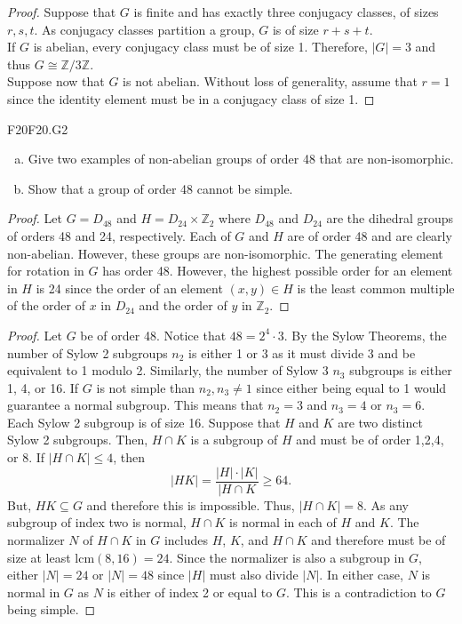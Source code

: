 \documentclass{article}
\newcommand{\Z}{\mathbb{Z}}
\newcommand{\sq}{\subseteq}
\newcommand{\lcm}{\textrm{lcm}}
\theoremstyle{definition}
\begin{document}
	\begin{proof}
	Suppose that $G$ is finite and has exactly three conjugacy classes, of sizes $r, s, t$. As conjugacy classes partition a group, $G$ is of size $r + s + t$.\\
	
	If $G$ is abelian, every conjugacy class must be of size 1. Therefore, $|G| = 3$ and thus $G \cong \Z/3\Z$.\\
	
	Suppose now that $G$ is not abelian. Without loss of generality, assume that $r = 1$ since the identity element must be in a conjugacy class of size 1. 
	\end{proof}
	
	
	\begin{prob}{F20}{F20.G2}
	\begin{enumerate}[(a)]
	\item Give two examples of non-abelian groups of order 48 that are non-isomorphic.
	\item Show that a group of order 48 cannot be simple.
	\end{enumerate}
	\end{prob}
	
	\begin{proof}
	Let $G = D_{48}$ and $H = D_{24} \times \Z_2$ where $D_{48}$ and $D_{24}$ are the dihedral groups of orders 48 and 24, respectively. Each of $G$ and $H$ are of order 48 and are clearly non-abelian. However, these groups are non-isomorphic. The generating element for rotation in $G$ has order 48. However, the highest possible order for an element in $H$ is 24 since the order of an element $(x,y) \in H$ is the least common multiple of the order of $x$ in $D_{24}$ and the order of $y$ in $\Z_2$.
	\end{proof}
	
	\begin{proof}
	Let $G$ be of order 48. Notice that $48 = 2^4 \cdot 3$. By the Sylow Theorems, the number of Sylow 2 subgroups $n_2$ is either 1 or 3 as it must divide 3 and be equivalent to 1 modulo 2. Similarly, the number of Sylow 3 $n_3$ subgroups is either 1, 4, or 16. If $G$ is not simple than $n_2, n_3 \neq 1$ since either being equal to 1 would guarantee a normal subgroup. This means that $n_2 = 3$ and $n_3 = 4$ or $n_3 = 6$. Each Sylow 2 subgroup is of size 16. Suppose that $H$ and $K$ are two distinct Sylow 2 subgroups. Then, $H \cap K$ is a subgroup of $H$ and must be of order 1,2,4, or 8. If $|H \cap K| \leq 4$, then
	\[ |HK| = \frac{|H|\cdot|K|}{|H\cap K} \geq 64. \]
But, $HK \sq G$ and therefore this is impossible. Thus, $|H \cap K| = 8$. As any subgroup of index two is normal, $H \cap K$ is normal in each of $H$ and $K$. The normalizer $N$ of $H\cap K$ in $G$ includes $H$, $K$, and $H \cap K$ and therefore must be of size at least $\lcm(8,16) = 24$. Since the normalizer is also a subgroup in $G$, either $|N| = 24$ or $|N| = 48$ since $|H|$ must also divide $|N|$. In either case, $N$ is normal in $G$ as $N$ is either of index 2 or equal to $G$. This is a contradiction to $G$ being simple.
	\end{proof}
	
\end{document}
